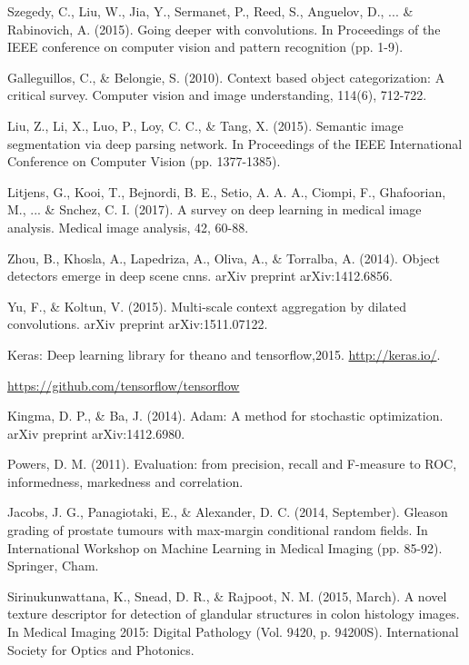 \documentclass[10pt,twocolumn]{article}
\begin{document}
\begin{thebibliography}{}
Szegedy, C., Liu, W., Jia, Y., Sermanet, P., Reed, S., Anguelov, D., ... \& Rabinovich, A. (2015). Going deeper with convolutions. In Proceedings of the IEEE conference on computer vision and pattern recognition (pp. 1-9).

Galleguillos, C., \& Belongie, S. (2010). Context based object categorization: A critical survey. Computer vision and image understanding, 114(6), 712-722.

Liu, Z., Li, X., Luo, P., Loy, C. C., \& Tang, X. (2015). Semantic image segmentation via deep parsing network. In Proceedings of the IEEE International Conference on Computer Vision (pp. 1377-1385).

Litjens, G., Kooi, T., Bejnordi, B. E., Setio, A. A. A., Ciompi, F., Ghafoorian, M., ... \& Snchez, C. I. (2017). A survey on deep learning in medical image analysis. Medical image analysis, 42, 60-88.


Zhou, B., Khosla, A., Lapedriza, A., Oliva, A., \& Torralba, A. (2014). Object detectors emerge in deep scene cnns. arXiv preprint arXiv:1412.6856.

Yu, F., \& Koltun, V. (2015). Multi-scale context aggregation by dilated convolutions. arXiv preprint arXiv:1511.07122.

Keras: Deep learning library for theano and tensorflow,2015. \href{http://keras.io/}{http://keras.io/}.

\href{https://github.com/tensorflow/tensorflow}{https://github.com/tensorflow/tensorflow}

Kingma, D. P., \& Ba, J. (2014). Adam: A method for stochastic optimization. arXiv preprint arXiv:1412.6980.


Powers, D. M. (2011). Evaluation: from precision, recall and F-measure to ROC, informedness, markedness and correlation.


Jacobs, J. G., Panagiotaki, E., \& Alexander, D. C. (2014, September). Gleason grading of prostate tumours with max-margin conditional random fields. In International Workshop on Machine Learning in Medical Imaging (pp. 85-92). Springer, Cham.

Sirinukunwattana, K., Snead, D. R., \& Rajpoot, N. M. (2015, March). A novel texture descriptor for detection of glandular structures in colon histology images. In Medical Imaging 2015: Digital Pathology (Vol. 9420, p. 94200S). International Society for Optics and Photonics.



\end{thebibliography}
\end{document}
